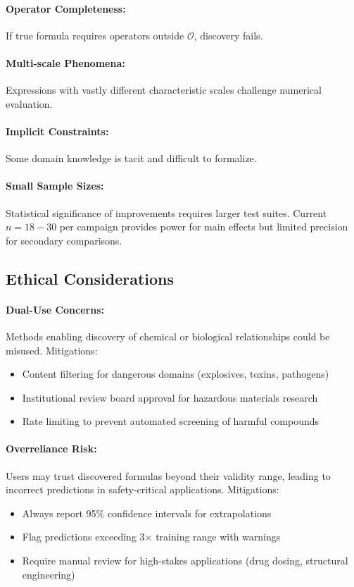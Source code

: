\documentclass[twoside,11pt]{article}
\begin{document}
\paragraph{Operator Completeness:} If true formula requires operators outside $\mathcal{O}$, discovery fails\citep{koza1994genetic}.

\paragraph{Multi-scale Phenomena:} Expressions with vastly different characteristic scales challenge numerical evaluation.

\paragraph{Implicit Constraints:} Some domain knowledge is tacit and difficult to formalize.

\paragraph{Small Sample Sizes:} Statistical significance of improvements requires larger test suites. Current $n = 18-30$ per campaign provides power for main effects but limited precision for secondary comparisons.


\subsection{Ethical Considerations}

\paragraph{Dual-Use Concerns:} Methods enabling discovery of chemical or biological relationships could be misused\citep{koza1994genetic}. Mitigations:
\begin{itemize}
\item Content filtering for dangerous domains (explosives, toxins, pathogens)
\item Institutional review board approval for hazardous materials research
\item Rate limiting to prevent automated screening of harmful compounds
\end{itemize}

\paragraph{Overreliance Risk:} Users may trust discovered formulas beyond their validity range, leading to incorrect predictions in safety-critical applications. Mitigations:
\begin{itemize}
\item Always report 95\% confidence intervals for extrapolations
\item Flag predictions exceeding 3$\times$ training range with warnings
\item Require manual review for high-stakes applications (drug dosing, structural engineering)
\end{itemize}
\end{document}
